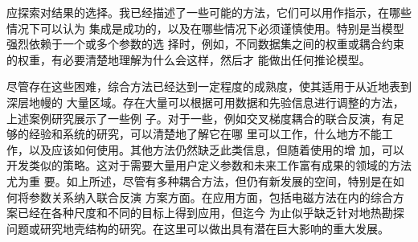 应探索对结果的选择。我已经描述了一些可能的方法，它们可以用作指示，在哪些情况下可以认为 集成是成功的，以及在哪些情况下必须谨慎使用。特别是当模型强烈依赖于一个或多个参数的选 择时，例如，不同数据集之间的权重或耦合约束的权重，有必要清楚地理解为什么会这样，然后才 能做出任何推论模型。

尽管存在这些困难，综合方法已经达到一定程度的成熟度，使其适用于从近地表到深层地幔的 大量区域。存在大量可以根据可用数据和先验信息进行调整的方法，上述案例研究展示了一些例 子。对于一些，例如交叉梯度耦合的联合反演，有足够的经验和系统的研究，可以清楚地了解它在哪 里可以工作，什么地方不能工作，以及应该如何使用。其他方法仍然缺乏此类信息，但随着使用的增 加，可以开发类似的策略。这对于需要大量用户定义参数和未来工作富有成果的领域的方法尤为重 要。如上所述，尽管有多种耦合方法，但仍有新发展的空间，特别是在如何将参数关系纳入联合反演 方案方面。在应用方面，包括电磁方法在内的综合方案已经在各种尺度和不同的目标上得到应用，但迄今 为止似乎缺乏针对地热勘探问题或研究地壳结构的研究。在这里可以做出具有潜在巨大影响的重大发展。
